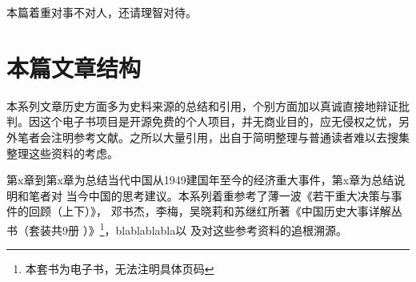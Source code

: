 本篇着重对事不对人，还请理智对待。


\section{本篇文章结构}

本系列文章历史方面多为史料来源的总结和引用，个别方面加以真诚直接地辩证批判。因这个电子书项目是开源免费的个人项目，并无商业目的，应无侵权之忧，另外笔者会注明参考文献。之所以大量引用，出自于简明整理与普通读者难以去搜集整理这些资料的考虑。

第x章到第x章为总结当代中国从1949建国年至今的经济重大事件，第x章为总结说明和笔者对
当今中国的思考建议。本系列着重参考了薄一波《若干重大决策与事件的回顾（上下）》，
邓书杰，李梅，吴晓莉和苏继红所著《中国历史大事详解丛书（套装共9册
）》\cite{zhengshujie}\footnote{本套书为电子书，无法注明具体页码}，blablablabla以
及对这些参考资料的追根溯源。



